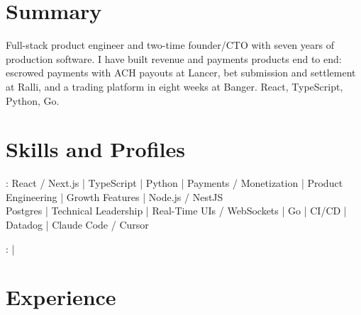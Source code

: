 \documentclass[print]{jack-resume}
\begin{document}
\pagecolor{darkmodeBackground}


\begin{minipage}[t][1cm][t]{.03\textwidth}
    \hfill
\end{minipage}

\section{Summary}
Full-stack product engineer and two-time founder/CTO with seven years of production software. I have built revenue and payments products end to end: escrowed payments with ACH payouts at Lancer, bet submission and settlement at Ralli, and a trading platform in eight weeks at Banger. React, TypeScript, Python, Go.
\sectionsep

\section{Skills and Profiles}
:
React / Next.js \hfill | \hfill
TypeScript \hfill | \hfill
Python \hfill | \hfill
Payments / Monetization \hfill | \hfill
Product Engineering \hfill | \hfill
Growth Features \hfill | \hfill
Node.js / NestJS \\
\hspace{1.0cm} Postgres \hfill | \hfill
Technical Leadership \hfill | \hfill
Real-Time UIs / WebSockets \hfill | \hfill
Go \hfill | \hfill
CI/CD \hfill | \hfill
Datadog \hfill | \hfill
Claude Code / Cursor \\

\raggedright{
    :
      \href{https://www.linkedin.com/in/jack-sturtevant/}{ \ExternalLink} |
     \href{https://github.com/jacksturt}{ \ExternalLink}}

\section{Experience}
\end{document}
